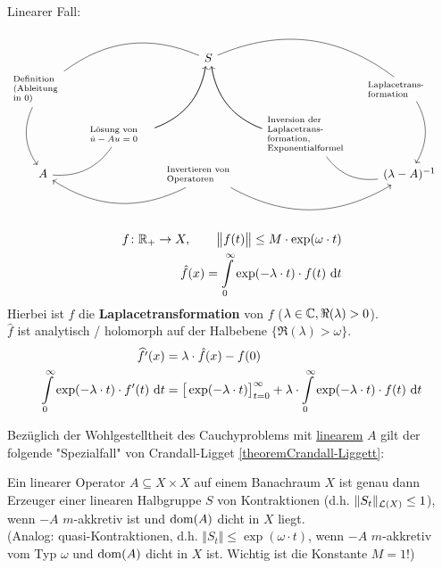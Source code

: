 Linearer Fall:
$$
\begin{tikzcd}[sep=tiny]
	& & S \arrow[drr, dash, bend left] \arrow[ddr, dash, bend right] \arrow[ddl, dash, bend left] \arrow[dll, dash, bend right]
	& & \\
	\parbox{50pt}{\scriptsize Definition\\(Ableitung\\in $0$)} 
	\arrow[dd, bend right]
	& & & 
	& \parbox{70pt}{\scriptsize Laplacetrans-\\formation}
	\arrow[dd, bend left]	\\
	&\parbox{50pt}{\scriptsize Lösung von \\$\dot{u}-Au=0$} 
	\arrow[uur, bend right]
	& 
	&\parbox{70pt}{\scriptsize Inversion der\\Laplacetrans-\\formation,\\Exponentialformel}
	\arrow[uul, bend left] 
	\\
	A \arrow[ur, dash, bend right] & & \arrow[ll, bend left] \parbox{70pt}{\scriptsize Invertieren von\\Operatoren} \arrow[rr, bend right]& & (\lambda - A)^{-1} \arrow[ul, dash, bend left]
\end{tikzcd}
$$

\begin{align*}
	f\colon\mathbb{R}_+\to X,\qquad\big\Vert f(t)\big\Vert\leq M\cdot\exp(\omega\cdot t)\\
	\hat{f}(x)=\int\limits_0^\infty\exp(-\lambda\cdot t)\cdot f(t)\text{ d} t
\end{align*}
Hierbei ist $\hat{f}$ die \textbf{Laplacetransformation} von $f$ ($\lambda\in\mathbb{C},\Re(\lambda)>0$).\\
$\hat{f}$ ist analytisch / holomorph auf der Halbebene $\big\lbrace\Re(\lambda)>\omega\big\rbrace$. 
\begin{align*}
	\widehat{f'}(x)&=\lambda\cdot\hat{f}(x)-f(0)\\
	\int\limits_0^\infty\exp(-\lambda\cdot t)\cdot f'(t)\text{ d} t
	&=\big[\exp(-\lambda\cdot t)\big]_{t=0}^\infty+\lambda\cdot\int\limits_0^\infty\exp(-\lambda\cdot t)\cdot f(t)\text{ d} t
\end{align*}

Bezüglich der Wohlgestelltheit des Cauchyproblems mit \ul{linearem} $A$ gilt der folgende "Spezialfall" von Crandall-Ligget \ref{theoremCrandall-Liggett}:

\begin{theorem}\enter
	Ein linearer Operator $A\subseteq X\times X$ auf einem Banachraum $X$ ist genau dann Erzeuger einer linearen Halbgruppe $S$ von Kontraktionen 
	(d.h. $\Vert S_t\Vert_{\mathcal{L}(X)}\leq 1$), wenn $-A$ $m$-akkretiv ist und $\operatorname{dom}(A)$ dicht in $X$ liegt.\\
	(Analog: quasi-Kontraktionen, d.h. $\Vert S_t\Vert\leq\exp(\omega\cdot t)$, wenn $-A$ $m$-akkretiv vom Typ $\omega$ und $\operatorname{dom}(A)$ dicht in $X$ ist.
	Wichtig ist die Konstante $M=1$!)
\end{theorem}

